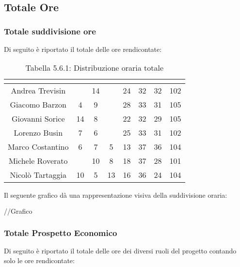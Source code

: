\subsection{Totale Ore}

\subsubsection{Totale suddivisione ore}
Di seguito è riportato il totale delle ore rendicontate:

\renewcommand{\arraystretch}{1.5}
\begin{table}[H]
\begin{center}
\begin{tabular}{|c|c|c|c|c|c|c|c|}
\hline
\rowcolor{title_row}
\textbf{\color{title_text}{Nome}} & \textbf{\color{title_text}{Resp.}} & \textbf{\color{title_text}{Ammi.}} & \textbf{\color{title_text}{Analist.}} & \textbf{\color{title_text}{Progett.}} & \textbf{\color{title_text}{Program.}} & \textbf{\color{title_text}{Verific.}} & \textbf{\color{title_text}{Totale}} \\ \hline
Andrea Trevisin  & & 14 & & 24 & 32 & 32 & 102  \\ \hline
Giacomo Barzon   & 4 & 9 & & 28 & 33 & 31 & 105  \\ \hline
Giovanni Sorice  & 14 & 8 & & 22 & 32 & 29 & 105 \\ \hline
Lorenzo Busin    & 7 & 6 & & 25 & 33 & 31 & 102 \\ \hline
Marco Costantino & 6 & 7 & 5 & 13 & 37 & 36 & 104 \\ \hline
Michele Roverato & & 10 & 8 & 18 & 37 & 28 & 101 \\ \hline
Nicolò Tartaggia & 10 & 5 & 13 & 16 & 36 & 24 & 104  \\ \hline
\end{tabular}
\caption{Tabella 5.6.1: Distribuzione oraria totale\label{}}
\end{center}
\end{table}
\renewcommand{\arraystretch}{1}

Il seguente grafico dà una rappresentazione visiva della suddivisione oraria: \\
\begin{center}
//Grafico
\end{center}

\subsubsection{Totale Prospetto Economico}
Di seguito è riportato il totale delle ore dei diversi ruoli del progetto contando solo le ore rendicontate:

